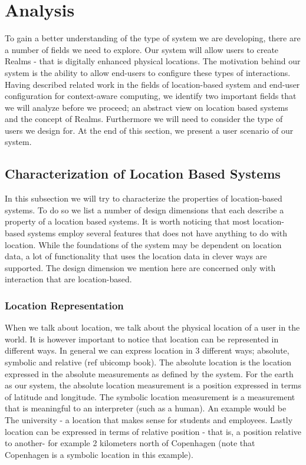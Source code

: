 \section{Analysis} %
\label{sec:analysis}
To gain a better understanding of the type of system we are developing, there are a number of fields we need to explore. Our system will allow users to create Realms - that is digitally enhanced physical locations. The motivation behind our system is the ability to allow end-users to configure these types of interactions. Having described related work in the fields of location-based system and end-user configuration for context-aware computing, we identify two important fields that we will analyze before we proceed; an abstract view on location based systems and the concept of Realms. Furthermore we will need to consider the type of users we design for. At the end of this section, we present a user scenario of our system.

\subsection{Characterization of Location Based Systems} %
\label{sub:taxanomy_of_location_features}
In this subsection we will try to characterize the properties of location-based systems. To do so we list a number of design dimensions that each describe a property of a location based systems. It is worth noticing that most location-based systems employ several features that does not have anything to do with location. While the foundations of the system may be dependent on location data, a lot of functionality that uses the location data in clever ways are supported. The design dimension we mention here are concerned only with interaction that are location-based. 

\subsubsection{Location Representation}
When we talk about location, we talk about the physical location of a user in the world. It is however important to notice that location can be represented in different ways. In general we can express location in 3 different ways; absolute, symbolic and relative (ref ubicomp book). The absolute location is the location expressed in the absolute measurements as defined by the system. For the earth as our system, the absolute location measurement is a position expressed in terms of latitude and longitude. The symbolic location measurement is a measurement that is meaningful to an interpreter (such as a human). An example would be The university - a location that makes sense for students and employees. Lastly location can be expressed in terms of relative position - that is, a position relative to another- for example 2 kilometers north of Copenhagen (note that Copenhagen is a symbolic location in this example).

